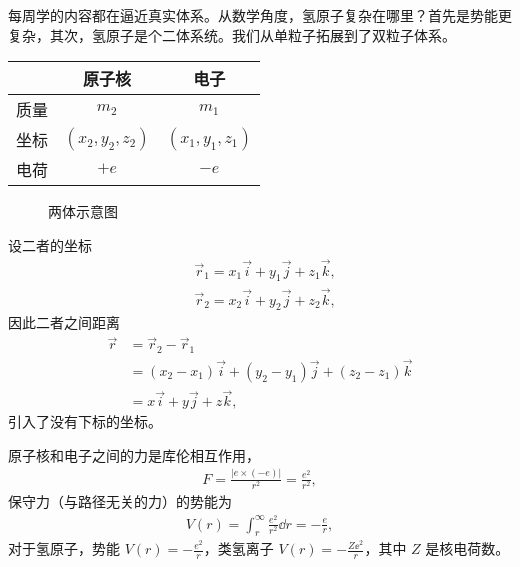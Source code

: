 每周学的内容都在逼近真实体系。从数学角度，氢原子复杂在哪里？首先是势能更复杂，其次，氢原子是个二体系统。我们从单粒子拓展到了双粒子体系。
\begin{table}[ht]
\centering
\begin{tabular}[t]{lcc}
\toprule
&原子核 & 电子 \\
\midrule
质量 & $m_2$ & $m_1$ \\
坐标 & $(x_2,y_2,z_2)$ & $(x_1,y_1,z_1)$\\
电荷 & $+e$ & $-e$ \\
\bottomrule
\end{tabular}
\end{table}%

\begin{figure}[tp]\centering
    \caption{两体示意图}
    \end{figure}
设二者的坐标
\begin{align}
    &\vec r_1 = x_1 \vec i + y_1 \vec j + z_1 \vec k, \\
    &\vec r_2 = x_2 \vec i + y_2 \vec j + z_2 \vec k,
\end{align}
因此二者之间距离
\begin{align}
    \vec r &= \vec r_2 - \vec r_1 \\
    &= (x_2 - x_1) \vec i + (y_2 - y_1) \vec j + (z_2 - z_1) \vec k\\
    &=x \vec i + y \vec j + z \vec k,
\end{align}
引入了没有下标的坐标。

原子核和电子之间的力是库伦相互作用，
\begin{align}
    F = \frac{|e\times(-e)|}{r^2} = \frac{e^2}{r^2},
\end{align}
保守力（与路径无关的力）的势能为
\begin{align}
    V(r) = \int_r^\infty \frac{e^2}{r^2} \dd r = - \frac{e}{r},
\end{align}
对于氢原子，势能 $V(r) = -\frac{e^2}{r}$，类氢离子 $V(r) = - \frac{Z \ee^2}{r}$，其中 $Z$ 是核电荷数。


